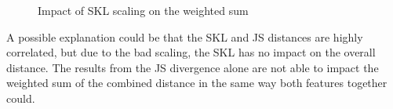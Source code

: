 \begin{figure}[htbp]
	\centering
	\caption{Impact of SKL scaling on the weighted sum}
	\label{fig:sklsc}
\end{figure}

\noindent A possible explanation could be that the SKL and JS distances are highly correlated, but due to the bad scaling, the SKL has no impact on the overall distance. The results from the JS divergence alone are not able to impact the weighted sum of the combined distance in the same way both features together could. 

